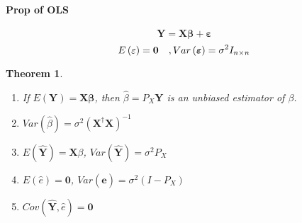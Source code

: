\documentclass{article}
\newtheorem{theorem}{Theorem}
\begin{document}
\bigskip

\paragraph{Prop of OLS}

\begin{equation*}
\mathbf{Y=X\beta +\varepsilon }
\end{equation*}%
\begin{equation*}
E\left( \varepsilon \right) =\boldsymbol{0\quad },Var\left( \mathbf{%
\varepsilon }\right) =\sigma ^{2}I_{n\times n}
\end{equation*}

\begin{theorem}
\begin{enumerate}
\item If $E\left( \mathbf{Y}\right) =\mathbf{X\beta }$, then $\hat{\beta}%
=P_{X}\mathbf{Y}$ is an unbiased estimator of $\beta $.

\item $Var\left( \hat{\beta}\right) =\sigma ^{2}\left( \mathbf{X}^{\dagger }%
\mathbf{X}\right) ^{-1}$

\item $E\left( \mathbf{\hat{Y}}\right) =\mathbf{X}\beta $, $Var\left( 
\mathbf{\hat{Y}}\right) =\sigma ^{2}P_{X}$

\item $E\left( \hat{e}\right) =\boldsymbol{0}$, $Var\left( \mathbf{\hat{e}}%
\right) =\sigma ^{2}\left( I-P_{X}\right) $

\item $Cov\left( \mathbf{\hat{Y},}\hat{e}\right) =\boldsymbol{0}$
\end{enumerate}
\end{theorem}
\end{document}
